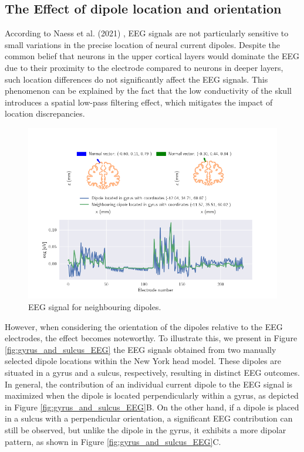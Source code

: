\documentclass[a4paper, UKenglish, 11pt]{uiomaster}
\begin{document}
\subsection{The Effect of dipole location and orientation}
According to Naess et al. (2021) \cite{naess2021biophysically}, EEG signals are not particularly sensitive to small variations in the precise location of neural current dipoles. Despite the common belief that neurons in the upper cortical layers would dominate the EEG due to their proximity to the electrode compared to neurons in deeper layers, such location differences do not significantly affect the EEG signals. This phenomenon can be explained by the fact that the low conductivity of the skull introduces a spatial low-pass filtering effect, which mitigates the impact of location discrepancies.

\begin{figure}[!htb]
    \centering
    \includegraphics[width=\linewidth]{figures/neighbour_dipoles.png}
    \caption{EEG signal for neighbouring dipoles.}
    \label{fig:neighbour_dipoles}
\end{figure}

However, when considering the orientation of the dipoles relative to the EEG electrodes, the effect becomes noteworthy. To illustrate this, we present in Figure \ref{fig:gyrus_and_sulcus_EEG} the EEG signals obtained from two manually selected dipole locations within the New York head model. These dipoles are situated in a gyrus and a sulcus, respectively, resulting in distinct EEG outcomes. In general, the contribution of an individual current dipole to the EEG signal is maximized when the dipole is located perpendicularly within a gyrus, as depicted in Figure \ref{fig:gyrus_and_sulcus_EEG}B. On the other hand, if a dipole is placed in a sulcus with a perpendicular orientation, a significant EEG contribution can still be observed, but unlike the dipole in the gyrus, it exhibits a more dipolar pattern, as shown in Figure \ref{fig:gyrus_and_sulcus_EEG}C.
\end{document}
